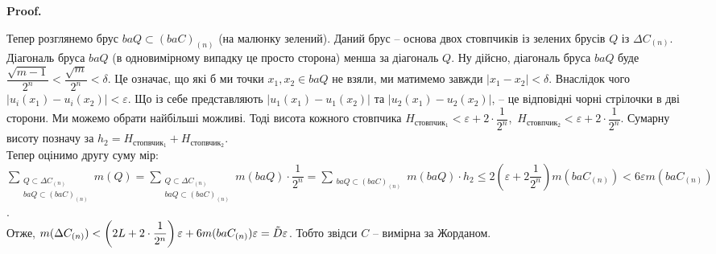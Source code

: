 \documentclass[a4paper, 10pt]{article}
\makeatletter
\def\qed{$\blacksquare$}
\theoremstyle{theoremdd}
\theoremstyle{theoremdd}
\theoremstyle{theoremdd}
\theoremstyle{theoremdd}
\theoremstyle{theoremdd}
\theoremstyle{theoremdd}
\theoremstyle{theoremdd}
\theoremstyle{theoremdd}
\renewenvironment{proof}[1][Proof.\\]{\par
\pushQED{\hfill \qed}%
\normalfont \topsep6\p@\@plus6\p@\relax
\trivlist
\item\relax
{\bfseries
#1\@addpunct{.}}\hspace\labelsep\ignorespaces
}{%
\popQED\endtrivlist\@endpefalse
}
\makeatother
\begin{document}
\begin{proof}
\begin{figure}[H]
\end{figure}
Тепер розглянемо брус $baQ \subset (baC)_{(n)}$ (на малюнку зелений). Даний брус -- основа двох стовпчиків із зелених брусів $Q$ із $\Delta C_{(n)}$. Діагональ бруса $baQ$ (в одновимірному випадку це просто сторона) менша за діагональ $Q$. Ну дійсно, діагональ бруса $baQ$ буде $\dfrac{\sqrt{m-1}}{2^n} < \dfrac{\sqrt{m}}{2^n} < \delta$. Це означає, що які б ми точки $x_1,x_2 \in baQ$ не взяли, ми матимемо завжди $|x_1-x_2| < \delta$. Внаслідок чого $|u_i(x_1) - u_i(x_2)| < \varepsilon$. Що із себе представляють $|u_1(x_1) - u_1(x_2)|$ та $|u_2(x_1) - u_2(x_2)|$, -- це відповідні чорні стрілочки в дві сторони. Ми можемо обрати найбільші можливі. Тоді висота кожного стовпчика $H_{\text{стовпчик}_1} < \varepsilon + 2 \cdot \dfrac{1}{2^n}$,\ $H_{\text{стовпчик}_2} < \varepsilon + 2 \cdot \dfrac{1}{2^n}$. Сумарну висоту позначу за $h_2 = H_{\text{стопвчик}_1} + H_{\text{стопвчик}_2}$.\\
Тепер оцінимо другу суму мір:\\
$\displaystyle\sum_{\substack{Q \subset \Delta C_{(n)} \\ baQ \subset (baC)_{(n)} }} m(Q) = \sum_{\substack{Q \subset \Delta C_{(n)} \\ baQ \subset (baC)_{(n)}}} m(baQ) \cdot \dfrac{1}{2^n} = \sum_{\substack{baQ \subset (baC)_{(n)}}} m(baQ) \cdot h_2 \leq 2 \left(  \varepsilon + 2 \dfrac{1}{2^n} \right) m(baC_{(n)}) < 6 \varepsilon m(baC_{(n)})$.\\
Отже, $m(\Delta C_{(n)}) \\ < \left( 2L + 2 \cdot \dfrac{1}{2^n} \right) \varepsilon + 6 m(baC_{(n)}) \varepsilon = \tilde{D} \varepsilon$. Тобто звідси $C$ -- вимірна за Жорданом.
\end{proof}
\end{document}
